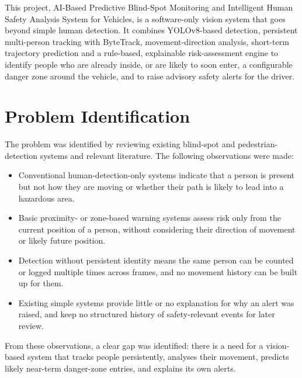 \documentclass[12pt,a4paper]{report}
\begin{document}
This project, AI-Based Predictive Blind-Spot Monitoring and Intelligent Human Safety Analysis System for Vehicles, is a software-only vision system that goes beyond simple human detection. It combines YOLOv8-based detection, persistent multi-person tracking with ByteTrack, movement-direction analysis, short-term trajectory prediction and a rule-based, explainable risk-assessment engine to identify people who are already inside, or are likely to soon enter, a configurable danger zone around the vehicle, and to raise advisory safety alerts for the driver.

\section{Problem Identification}
The problem was identified by reviewing existing blind-spot and pedestrian-detection systems and relevant literature. The following observations were made:
\begin{itemize}[leftmargin=*,itemsep=2pt]
\item Conventional human-detection-only systems indicate that a person is present but not how they are moving or whether their path is likely to lead into a hazardous area.
\item Basic proximity- or zone-based warning systems assess risk only from the current position of a person, without considering their direction of movement or likely future position.
\item Detection without persistent identity means the same person can be counted or logged multiple times across frames, and no movement history can be built up for them.
\item Existing simple systems provide little or no explanation for why an alert was raised, and keep no structured history of safety-relevant events for later review.
\end{itemize}
From these observations, a clear gap was identified: there is a need for a vision-based system that tracks people persistently, analyses their movement, predicts likely near-term danger-zone entries, and explains its own alerts.
\end{document}
